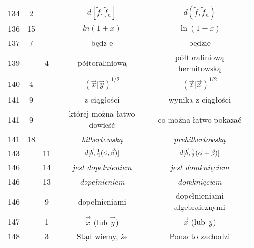 \documentclass[a4paper,11pt]{article}
\begin{document}
\begin{center}
\begin{tabular}{|c|c|c|c|c|}
    134 &  2 & & $d[ \tilde{ f }, \tilde{ f }_{ n } ]$
           & $d( \tilde{ f }, \tilde{ f }_{ n } )$ \\
    136 & 15 & & $ln( 1 + x )$ & $\ln( 1 + x )$ \\
    137 &  7 & & będz e & będzie \\
    139 & &  4 & półtoraliniową & półtoraliniową hermitowską \\
    140 &  4 & & $( \vec{ x } | \vec{ y } )^{ 1 / 2 }$
           & $( \vec{ x } | \vec{ x } )^{ 1 / 2 }$ \\
    141 &  9 & & z ciągłości & wynika z ciągłości \\
    141 &  9 & & której można łatwo dowieść & co można łatwo pokazać \\
    141 & 18 & & \emph{hilbertowską} & \emph{prehilbertowską} \\
    143 & & 11 & $d[ \vec{ b }, \frac{ 1 }{ 2 } ( \vec{ \alpha }, \vec{ \beta }) ]$
           & $d[ \vec{ b }, \frac{ 1 }{ 2 } ( \vec{ \alpha } + \vec{ \beta }) ]$
    \\
    146 & & 14 & \emph{jest dopełnieniem} & \emph{jest domknięciem} \\
    146 & & 13 & \emph{dopełnieniem} & \emph{domknięciem} \\
    146 & &  9 & dopełnieniami & dopełnieniami algebraicznymi \\
    147 & &  1 & $\vec{ \dot{ x } }$ (lub $\vec{ \dot{ y } }$)
           & $\vec{ x }$ (lub $\vec{ y }$) \\
    148 & &  3 & Stąd wiemy, że & Ponadto zachodzi \\
    \hline
  \end{tabular}


\end{center}
\end{document}
